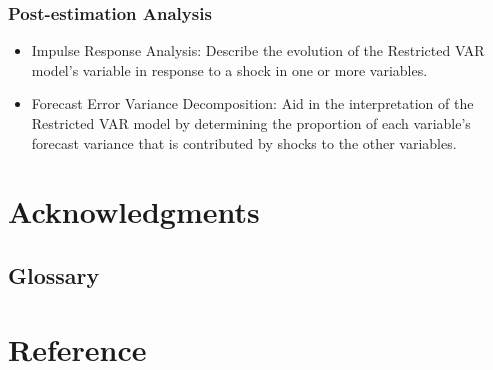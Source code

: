 \documentclass[11pt]{article}
\numberwithin{equation}{section}
\numberwithin{table}{section}
\numberwithin{figure}{section}
\begin{document}
\subsubsection{Post-estimation Analysis}
\begin{itemize}
  \item Impulse Response Analysis: Describe the evolution of the Restricted VAR model’s variable in response to a shock in one or more variables.
  \item Forecast Error Variance Decomposition: Aid in the interpretation of the Restricted VAR model by determining the proportion of each variable’s forecast variance that is contributed by shocks to the other variables.
\end{itemize}




\newpage
\section{Acknowledgments} \label{sec:thanks}






\begin{appendices}

\newpage
\section{Glossary} \label{sec:}


\end{appendices}




\newpage
\section*{Reference} \label{sec:ref}
\end{document}
